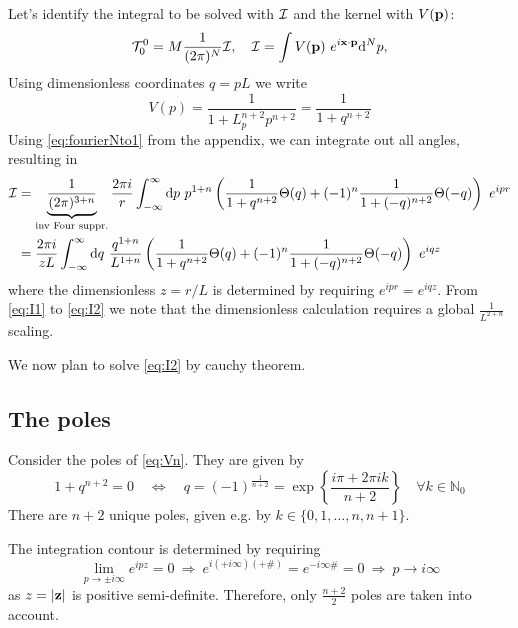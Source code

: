 \documentclass[10pt,a4paper]{article}
\begin{document}
Let's identify the integral to be solved with ${\cal I}$ and the kernel with $V(\mathbf{ p })$:
\begin{equation}
{\cal T}_0^0 = M \frac{1}{(2\pi)^N} {\cal I},
\quad 
{\cal I} = \int V(\mathbf{ p })~e^{i\mathbf{ x } \cdot \mathbf{ p }} \mathrm{d}^N p,
\end{equation}
Using dimensionless coordinates $q = pL$ we write
\begin{equation}\label{eq:Vn}
V(p) = \frac{1}{1+L_p^{n+2} p^{n+2}} = \frac 1{1 + q^{n+2}}
\end{equation}
Using \eqref{eq:fourierNto1} from the appendix, we can integrate out all angles, resulting in
\begin{subequations}
\begin{align}
\label{eq:I1}
{\cal I} &=
\underbrace{\frac{1}{(2\pi)^{3+n}}}_{\text{inv Four suppr.}}
 \frac{2\pi i}r \int_{-\infty}^\infty
\mathrm{d} p~
p^{1+n}
\left(
\frac{1}{1 + q^{n+2}} \Theta(q)
+ (-1)^n
\frac{1}{1 + (-q)^{n+2}} \Theta(-q)
\right)
~e^{ipr} \\
&=  \frac{2\pi i }{zL} \int_{-\infty}^\infty
\mathrm{d} q~
\frac{q^{1+n}}{L^{1+n}}
\left(
\frac{1}{1 + q^{n+2}} \Theta(q)
+ (-1)^n
\frac{1}{1 + (-q)^{n+2}} \Theta(-q)
\right)
~e^{iqz}
\label{eq:I2}
\end{align}
\end{subequations}
where the dimensionless $z=r/L$ is determined by requiring $e^{ipr} = e^{iqz}$. From \eqref{eq:I1} to \eqref{eq:I2} we note that the dimensionless calculation requires a global $\frac 1{L^{2+n}}$ scaling.

We now plan to solve \eqref{eq:I2} by cauchy theorem.

\subsection{The poles}
Consider the poles of \eqref{eq:Vn}. They are given by
\begin{equation} \label{eq:poles}
1 + q^{n+2} = 0
\quad\Leftrightarrow\quad
q = (-1)^{\frac 1{n+2}}
=\exp\left\{
\frac{i\pi + 2\pi i k}{n+2}
\right\}
\quad
\forall k\in \mathbb{N}_0
\end{equation}
There are $n+2$ unique poles, given e.g. by $k\in\{0,1,\dots,n,n+1\}$.

The integration contour is determined by requiring
\begin{equation} \label{eq:contour}
\lim_{p\to \pm i\infty} e^{ipz} = 0
~\Rightarrow~
e^{i(+i\infty)(+\#)} = e^{-i \infty \#} = 0
~\Rightarrow~
p\to i\infty
\end{equation}
as $z=|\mathbf{ z }|$ is positive semi-definite. Therefore, only $\frac{n+2}{2}$ poles are taken into account.
\end{document}
